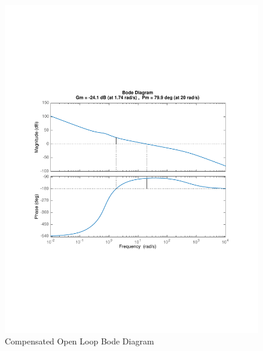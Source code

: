 \documentclass[12pt]{article}
\begin{document}
\begin{figure}[h]
\begin{center}
\includegraphics[width=1\textwidth]{figures/compensated_open_loop_bode}
\caption{Compensated Open Loop Bode Diagram}
\end{center}
\end{figure}
\end{document}
